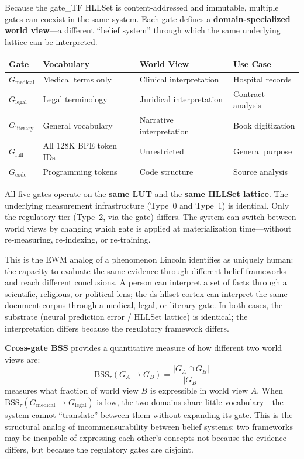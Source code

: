 \documentclass[11pt,a4paper]{article}
\theoremstyle{remark}
\begin{document}
Because the gate\_TF HLLSet is content-addressed and immutable, multiple gates
can coexist in the same system. Each gate defines a \textbf{domain-specialized
world view}---a different ``belief system'' through which the same underlying
lattice can be interpreted.

\begin{center}
\begin{tabular}{@{}llll@{}}
\toprule
\textbf{Gate} & \textbf{Vocabulary} & \textbf{World View} & \textbf{Use Case} \\
\midrule
$G_{\text{medical}}$  & Medical terms only       & Clinical interpretation  & Hospital records \\
$G_{\text{legal}}$    & Legal terminology        & Juridical interpretation & Contract analysis \\
$G_{\text{literary}}$ & General vocabulary       & Narrative interpretation  & Book digitization \\
$G_{\text{full}}$     & All 128K BPE token IDs   & Unrestricted              & General purpose \\
$G_{\text{code}}$     & Programming tokens       & Code structure            & Source analysis \\
\bottomrule
\end{tabular}
\end{center}

All five gates operate on the \textbf{same LUT} and the \textbf{same
HLLSet lattice}. The underlying measurement infrastructure (Type~0 and Type~1)
is identical. Only the regulatory tier (Type~2, via the gate) differs. The
system can switch between world views by changing which gate is applied at
materialization time---without re-measuring, re-indexing, or re-training.

This is the EWM analog of a phenomenon Lincoln identifies as uniquely human:
the capacity to evaluate the same evidence through different belief frameworks
and reach different conclusions. A person can interpret a set of facts through
a scientific, religious, or political lens; the ds-hllset-cortex can interpret
the same document corpus through a medical, legal, or literary gate. In both
cases, the substrate (neural prediction error / HLLSet lattice) is identical;
the interpretation differs because the regulatory framework differs.

\textbf{Cross-gate BSS} provides a quantitative measure of how different two
world views are:
\begin{equation}
  \text{BSS}_{\tau}(G_A \to G_B) = \frac{|G_A \cap G_B|}{|G_B|}
\end{equation}
measures what fraction of world view $B$ is expressible in world view $A$.
When $\text{BSS}_{\tau}(G_{\text{medical}} \to G_{\text{legal}})$ is low,
the two domains share little vocabulary---the system cannot ``translate''
between them without expanding its gate. This is the structural analog of
incommensurability between belief systems: two frameworks may be incapable of
expressing each other's concepts not because the evidence differs, but because
the regulatory gates are disjoint.
\end{document}

